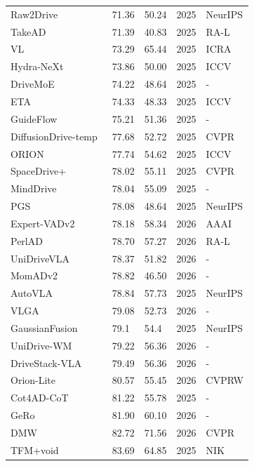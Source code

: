 \documentclass[10pt,twocolumn,letterpaper]{article}
\begin{document}
\begin{table}[t]
\begin{tabular}{l|ll|ll}
Raw2Drive~\cite{Yang2025NEURIPS} & 71.36 & 50.24 & 2025 & NeurIPS \\
TakeAD~\cite{Liu2025RAL} & 71.39 & 40.83 & 2025 & RA-L \\
VL~\cite{Arasteh2025ICRA} & 73.29 & 65.44 & 2025 & ICRA \\
Hydra-NeXt~\cite{Li2025ICCVb} & 73.86 & 50.00 & 2025 & ICCV \\
DriveMoE~\cite{Yang2025ARXIV} & 74.22 & 48.64 & 2025 & - \\
ETA~\cite{Hamdan2025ICCV} & 74.33 & 48.33 & 2025 & ICCV \\
GuideFlow~\cite{Liu2025ARXIVe} & 75.21 & 51.36 & 2025 & - \\
DiffusionDrive-temp~\cite{Liao2025CVPR} & 77.68 & 52.72 & 2025 & CVPR \\
ORION~\cite{Fu2025ICCV} & 77.74 & 54.62 & 2025 & ICCV \\
SpaceDrive+~\cite{Li2025ARXIVc} & 78.02 & 55.11 & 2025 & CVPR \\
MindDrive~\cite{Fu2025ARXIV} & 78.04 & 55.09 & 2025 & - \\
PGS~\cite{Huang2025NEURIPS} & 78.08 & 48.64 & 2025 & NeurIPS \\
Expert-VADv2~\cite{Jiang2026AAAI} & 78.18 & 58.34 & 2026 & AAAI \\
PerlAD~\cite{Gao20262ARXIV} & 78.70 & 57.27 & 2026 & RA-L \\
UniDriveVLA~\cite{Li2026ARXIV} & 78.37 & 51.82 & 2026 & - \\
MomADv2~\cite{Song2026ARXIV} & 78.82 & 46.50 & 2026 & - \\
AutoVLA~\cite{Zhou2025NEURIPS} & 78.84 & 57.73 & 2025 & NeurIPS \\
VLGA~\cite{Yao2026ARXIV} & 79.08 & 52.73 & 2026 & - \\
GaussianFusion~\cite{Liu2025NEURIPS} & 79.1 & 54.4 & 2025 & NeurIPS \\
UniDrive-WM~\cite{Xiong2026ARXIV} & 79.22 & 56.36 & 2026 & - \\
DriveStack-VLA~\cite{Wang2026ARXIVb} & 79.49 & 56.36 & 2026 & - \\
Orion-Lite~\cite{Gu2026CVPRWORK} & 80.57 & 55.45 & 2026 & CVPRW \\
Cot4AD-CoT~\cite{Wang2025ARXIVc} & 81.22 & 55.78 & 2025 & - \\
GeRo~\cite{Yasarla2026ARXIV} & 81.90 & 60.10 & 2026 & - \\
DMW~\cite{Wang2026CVPR} & 82.72 & 71.56 & 2026 & CVPR \\
TFM+void~\cite{Winje2025NIK} & 83.69 & 64.85 & 2025 & NIK \\

\end{tabular}
\end{table}
\end{document}
